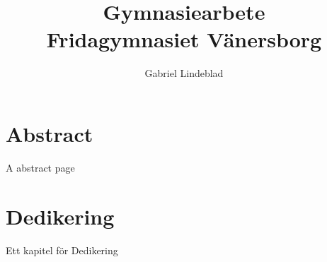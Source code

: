 \documentclass{report}
\title{Gymnasiearbete \\
{\Large Fridagymnasiet Vänersborg}}
\author{Gabriel Lindeblad}
\begin{document}
\maketitle

\chapter*{Abstract}
A abstract page

\chapter*{Dedikering}
Ett kapitel för Dedikering

\tableofcontents














\end{document}
